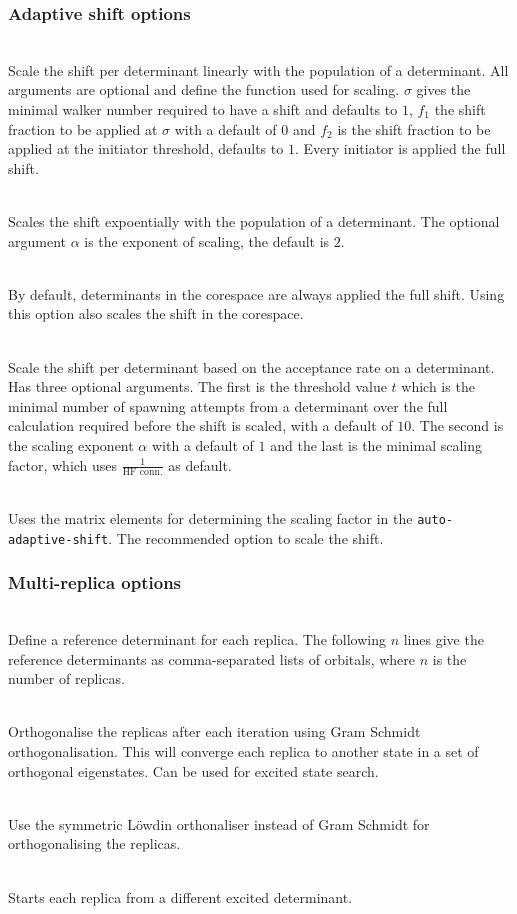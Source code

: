 \documentclass[a4paper,notitlepage]{scrreprt}
\newcommand\codeitem[1]{\needspace{1.5\baselineskip}\item[\textnormal{\ttfamily #1 \nopagebreak}] \hfill \\ \nopagebreak}
\begin{document}
  \subsubsection{Adaptive shift options}
  \begin{description}
    \codeitem{linear-adaptive-shift $\sigma$ $f_1$ $f_2$}
    Scale the shift per determinant linearly with the population of a determinant. All arguments are optional
    and define the function used for scaling. $\sigma$ gives the minimal
    walker number required to have a shift and defaults to $1$, $f_1$ the
    shift fraction to be applied at $\sigma$ with a default of $0$ and $f_2$
    is the shift fraction to be applied at the initiator threshold, defaults
    to $1$. Every initiator is applied the full shift.
    \codeitem{exp-adaptive-shift $\alpha$}
    Scales the shift expoentially with the population of a determinant. The
    optional argument $\alpha$ is the exponent of scaling, the default is $2$.
    \codeitem{core-adaptive-shift}
    By default, determinants in the corespace are always applied the full
    shift. Using this option also scales the shift in the corespace.
    \codeitem{auto-adpative-shift $t$ $\alpha$ $c$}
    Scale the shift per determinant based on the acceptance rate on a
    determinant. Has three optional arguments. The first is the threshold value $t$ which
    is the minimal number of spawning attempts from a determinant over the full calculation
    required before the shift is scaled, with a default of $10$. The second is
    the scaling exponent $\alpha$ with a default of $1$ and the last is the
    minimal scaling factor, which uses $\frac{1}{\text{HF conn.}}$ as default.
    \codeitem{aas-matele2}
    Uses the matrix elements for determining the scaling factor in the \texttt{auto-adaptive-shift}. The recommended option to scale the shift.
  \end{description}

  \subsubsection{Multi-replica options}
  \begin{description}
    \codeitem{multiple-initial-refs}
    Define a reference determinant for each replica. The following $n$ lines
    give the reference determinants as comma-separated lists of orbitals,
    where $n$ is the number of replicas.
    \codeitem{orthogonalise-replicas}
    Orthogonalise the replicas after each iteration using Gram Schmidt orthogonalisation. This will converge each
    replica to another state in a set of orthogonal eigenstates. Can be used
    for excited state search.
    \codeitem{orthogonalise-replicas-symmetric}
    Use the symmetric L{\"o}wdin orthonaliser instead of Gram Schmidt for
    orthogonalising the replicas.
    \codeitem{replica-single-det-start}
    Starts each replica from a different excited determinant.
  \end{description}
  
\end{document}
